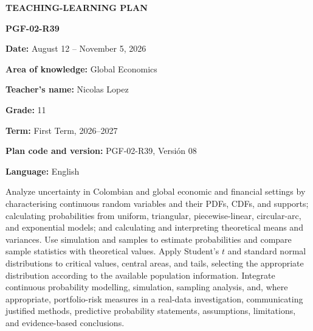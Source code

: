 \documentclass[10pt,letterpaper]{article}
\newcommand{\labelled}[2]{\textbf{#1:} #2\par}
\newcommand{\plansection}[1]{\Needspace{8\baselineskip}\par\vspace{8pt}{\large\bfseries #1\par}\vspace{3pt}}
\newcommand{\plansubsection}[1]{\Needspace{7\baselineskip}\par\vspace{5pt}{\normalsize\bfseries #1\par}\vspace{1pt}}
\begin{document}
	\vspace*{-0.25in}
	\begin{center}
		{\large\bfseries TEACHING-LEARNING PLAN}\par
		\vspace{2pt}
		\textbf{PGF-02-R39}\par
		\textbf{Date:} August 12 -- November 5, 2026
	\end{center}
	
	\plansection{1. Identification}
	\labelled{Area of knowledge}{Global Economics}
	\labelled{Teacher's name}{Nicolas Lopez}
	\labelled{Grade}{11}
	\labelled{Term}{First Term, 2026--2027}
	\labelled{Plan code and version}{PGF-02-R39, Versión 08}
	\labelled{Language}{English}
	
	\plansection{2. Learning Objective}
	\plansubsection{Learning Objective}
	Analyze uncertainty in Colombian and global economic and financial settings by characterising continuous random variables and their PDFs, CDFs, and supports; calculating probabilities from uniform, triangular, piecewise-linear, circular-arc, and exponential models; and calculating and interpreting theoretical means and variances. Use simulation and samples to estimate probabilities and compare sample statistics with theoretical values. Apply Student's $t$ and standard normal distributions to critical values, central areas, and tails, selecting the appropriate distribution according to the available population information. Integrate continuous probability modelling, simulation, sampling analysis, and, where appropriate, portfolio-risk measures in a real-data investigation, communicating justified methods, predictive probability statements, assumptions, limitations, and evidence-based conclusions.
	
\end{document}
